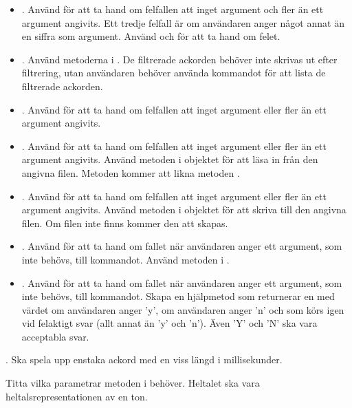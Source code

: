 {\begin{itemize}
\item {}. Använd  för att ta hand om felfallen att inget argument och fler än ett argument angivits. Ett tredje felfall är om användaren anger något annat än en siffra som argument. Använd  och  för att ta hand om felet.

\item {}. Använd metoderna i . De filtrerade ackorden behöver inte skrivas ut efter filtrering, utan användaren behöver använda kommandot  för att lista de filtrerade ackorden.

\item {}. Använd  för att ta hand om felfallen att inget argument eller fler än ett argument angivits.

\item {}. Använd  för att ta hand om felfallen att inget argument eller fler än ett argument angivits. Använd metoden  i objektet  för att läsa in från den angivna filen. Metoden kommer att likna metoden .

\item {}. Använd  för att ta hand om felfallen att inget argument eller fler än ett argument angivits. Använd metoden  i objektet  för att skriva till den angivna filen. Om filen inte finns kommer den att skapas.

\item {}. Använd  för att ta hand om fallet när användaren anger ett argument, som inte behövs, till kommandot. Använd metoden i .

\item {}. Använd  för att ta hand om fallet när användaren anger ett argument, som inte behövs, till kommandot. Skapa en hjälpmetod  som returnerar en  med värdet  om användaren anger 'y',  om användaren anger 'n' och som körs igen vid felaktigt svar (allt annat än 'y' och 'n'). Även 'Y' och 'N' ska vara acceptabla svar.
\end{itemize}

\Task {}. Ska spela upp enstaka ackord  med en viss längd  i millisekunder.

\Subtask Titta vilka parametrar metoden  i  behöver. Heltalet  ska vara heltalsrepresentationen av en ton.

}
